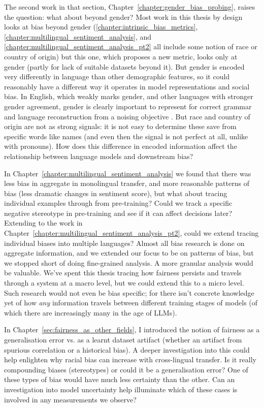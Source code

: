 The second work in that section, Chapter~\ref{chapter:gender_bias_probing}, raises the question: what about beyond gender? Most work in this thesis by design looks at bias beyond gender (\ref{chapter:intrinsic_bias_metrics}, \ref{chapter:multilingual_sentiment_analysis}, and \ref{chapter:multilingual_sentiment_analysis_pt2} all include some notion of race or country of origin) but this one,  which proposes a new metric, looks only at gender (partly for lack of suitable datasets beyond it). But gender is encoded very differently in language than other demographic features, so it could reasonably have a different way it operates in model representations and social bias. In English, which weakly marks gender, and other languages with stronger gender agreement, gender is clearly important to represent for correct grammar and language reconstruction from a noising objective \citep{}. But race and country of origin are not as strong signals: it is not easy to determine these save from specific words like names (and even then the signal is not perfect at all, unlike with pronouns). How does this difference in encoded information affect the relationship between language models and downstream bias?

In Chapter~\ref{chapter:multilingual_sentiment_analysis} we found that there was less bias in aggregate in monolingual transfer, and more reasonable patterns of bias (less dramatic changes in sentiment score), but what about tracing individual examples through from pre-training? Could we track a specific negative stereotype in pre-training and see if it can affect decisions later? Extending to the work in Chapter~\ref{chapter:multilingual_sentiment_analysis_pt2}, could we extend tracing individual biases into multiple languages? Almost all bias research is done on aggregate information, and we extended our focus to be on patterns of bias, but we stopped short of doing fine-grained analysis. A more granular analysis would be valuable. We've spent this thesis tracing how fairness persists and travels through a system at a macro level, but we could extend this to a micro level. Such research would not even be bias specific; for there isn't concrete knowledge yet of how \textit{any} information travels between different training stages of models (of which there are increasingly many in the age of LLMs).

In Chapter~\ref{sec:fairness_as_other_fields}, I introduced the notion of fairness as a generalisation error vs. as a learnt dataset artifact (whether an artifact from spurious correlation or a historical bias). A deeper investigation into this could help enlighten why racial bias can increase with cross-lingual transfer. Is it really compounding biases (stereotypes) or could it be a generalisation error? One of these types of bias would have much less certainty than the other. Can an investigation into model uncertainty help illuminate which of these cases is involved in any measurements we observe?

